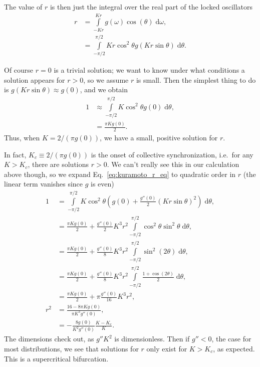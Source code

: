 \documentclass[11pt,
        usenames, %
        dvipsnames %
    ]{article}
\newcommand*{\p}[1]{\left(#1\right)}
\begin{document}
The value of $r$ is then just the integral over the real part of the locked
oscillators
\begin{align}
    r &= \int\limits_{-Kr}^{Kr} g(\omega) \cos(\theta)\;\mathrm{d}\omega,\\
        &= \int\limits_{-\pi/2}^{\pi/2}
            Kr\cos^2\theta g\p{Kr\sin \theta}\;\mathrm{d}\theta.
            \label{eq:kuramoto_r_eq}
\end{align}

Of course $r = 0$ is a trivial solution; we want to know under what conditions a
solution appears for $r > 0$, so we assume $r$ is small. Then the simplest thing
to do is $g\p{Kr\sin\theta} \approx g(0)$, and we obtain
\begin{align}
    1 &\approx \int\limits_{-\pi/2}^{\pi/2}
        K\cos^2\theta g(0)\;\mathrm{d}\theta,\\
        &= \frac{\pi K g(0)}{2}.
\end{align}
Thus, when $K = 2 / (\pi g(0))$, we have a small, positive solution for $r$.

In fact, $K_c \equiv 2 / (\pi g(0))$ is the onset of collective synchronization,
i.e.\ for any $K > K_c$, there are solutions $r > 0$. We can't really see this
in our calculation above though, so we expand Eq.~\eqref{eq:kuramoto_r_eq}
to quadratic order in $r$ (the linear term vanishes since $g$ is even)
\begin{align}
    1 &= \int\limits_{-\pi/2}^{\pi/2}
        K\cos^2\theta \p{g(0) + \frac{g''(0)}{2}\p{Kr\sin\theta}^2}\;\mathrm{d}
            \theta,\\
        &= \frac{\pi K g(0)}{2}
            + \frac{g''(0)}{2}K^3r^2
            \int\limits_{-\pi/2}^{\pi/2}\cos^2\theta\sin^2\theta
                \;\mathrm{d}\theta,\\
        &= \frac{\pi K g(0)}{2}
            + \frac{g''(0)}{8}K^3r^2
            \int\limits_{-\pi/2}^{\pi/2}\sin^2\p{2\theta}
                \;\mathrm{d}\theta,\\
        &= \frac{\pi K g(0)}{2}
            + \frac{g''(0)}{8}K^3r^2
            \int\limits_{-\pi/2}^{\pi/2}\frac{1 + \cos\p{2\theta}}{2}
                \;\mathrm{d}\theta,\\
        &= \frac{\pi K g(0)}{2}
            + \pi\frac{g''(0)}{16}K^3r^2,\\
    r^2 &= \frac{16 - 8\pi K g(0)}{\pi K^3 g''(0)},\\
        &= -\frac{8g(0)}{K^2g''(0)}\frac{K - K_c}{K}.
\end{align}
The dimensions check out, as $g''K^2$ is dimensionless. Then if $g'' < 0$, the
case for most distributions, we see that solutions for $r$ only exist for $K >
K_c$, as expected. This is a supercritical bifurcation.
\end{document}
